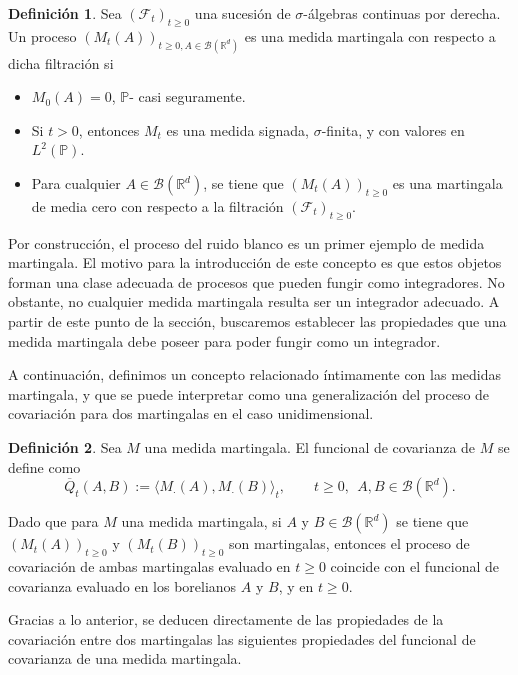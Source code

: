 \documentclass[letterpaper,twoside,12pt]{book}
\newcommand{\R}{\mathbb{R}}
\newcommand{\F}{\mathcal{F}}
\newcommand{\B}{\mathcal{B}}
\renewcommand{\P}{\mathbb{P}}
\newcommand{\1}{\mathds{1}}
\theoremstyle{definition}
\newtheorem{dfn}{Definición}
\theoremstyle{definition}
\theoremstyle{remark}
\theoremstyle{definition}
\theoremstyle{definition}
\theoremstyle{definition}
\theoremstyle{definition}
\theoremstyle{definition}
\begin{document}
\begin{dfn} 
Sea $(\F_t)_{t\geq0}$ una sucesión de $\sigma$-álgebras continuas por derecha. Un proceso $(M_t(A))_{t\geq0, A\in \B(\R^{d})}$ es una medida martingala con respecto a dicha filtración si 
\begin{itemize}
   \item $M_0(A)=0$, $\P$- casi seguramente.
   \item Si $t>0$, entonces $M_t$ es una medida signada, $\sigma$-finita, y con valores en $L^2(\P)$.
   \item Para cualquier $A\in \B(\R^{d})$, se tiene que $(M_t(A))_{t\geq0}$ es una martingala de media cero con respecto a la filtración $(\F_t)_{t\geq0}$.
\end{itemize}
\end{dfn}
Por construcción, el proceso del ruido blanco es un primer ejemplo de medida martingala. El motivo para la introducción de este concepto es que estos objetos forman una clase adecuada de procesos que pueden fungir como integradores. No obstante, no cualquier medida martingala resulta ser un integrador adecuado. A partir de este punto de la sección, buscaremos establecer las propiedades que una medida martingala debe poseer para poder fungir como un integrador. 

A continuación, definimos un concepto relacionado íntimamente con las medidas martingala, y que se puede interpretar como una generalización del proceso de covariación para dos martingalas en el caso unidimensional.

\begin{dfn} 
 Sea $M$ una medida martingala. El funcional de covarianza de $M$ se define como
 \[
 \overline{Q}_t(A,B):= \langle M_\cdot(A),M_\cdot (B)\rangle_t, \qquad t\geq 0, \ \ A, B \in \B(\R^{d}). 
 \]
 \end{dfn}
 Dado que para $M$ una medida martingala, si $A$ y $B \in \B(\R^{d})$ se tiene que $(M_t(A))_{t\geq0}$ y $(M_t(B))_{t\geq0}$ son martingalas, entonces el proceso de covariación de ambas martingalas evaluado en $t\geq0$ coincide con el funcional de covarianza evaluado en los borelianos $A$ y $B$, y en $t\geq0$.

 Gracias a lo anterior, se deducen directamente de las propiedades de la covariación entre dos martingalas las siguientes propiedades del funcional de covarianza de una medida martingala.
\end{document}
